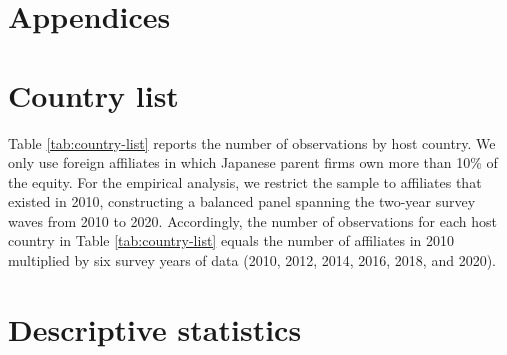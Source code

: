 \documentclass[preprint,11pt,authoryear]{elsarticle}
\begin{document}
%
%
%
%
%
%





\newpage
\appendix
\setcounter{table}{0}
\renewcommand{\tablename}{Appendix Table}
\renewcommand{\figurename}{Figure}
\renewcommand{\thetable}{A\arabic{table}}
\setcounter{figure}{0}
\renewcommand{\thefigure}{A\arabic{figure}}



\appendix
\newpage 
\section*{Appendices}


\section{Country list}\label{country}

Table \ref{tab:country-list} reports the number of observations by host country.
We only use foreign affiliates in which Japanese parent firms own more than 10\% of the equity.
For the empirical analysis, we restrict the sample to affiliates that existed in 2010, constructing a balanced panel spanning the two-year survey waves from 2010 to 2020.
Accordingly, the number of observations for each host country in Table \ref{tab:country-list} equals the number of affiliates in 2010 multiplied by six survey years of data (2010, 2012, 2014, 2016, 2018, and 2020).

{\renewcommand\normalsize{\scriptsize}%
\normalsize 

}



\clearpage
\section{Descriptive statistics}\label{descriptive}
\end{document}
